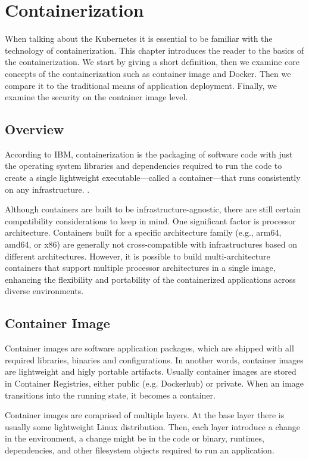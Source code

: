 \section{Containerization}

When talking about the Kubernetes it is essential to be familiar with the technology of containerization. This chapter introduces the reader to the basics of the containerization. We start by giving a short definition, then we examine core concepts of the containerization such as container image and Docker. Then we compare it to the traditional means of application deployment. Finally, we examine the security on the container image level.

\subsection{Overview}

According to IBM, containerization is the packaging of software code with just the operating system libraries and dependencies required to run the code to create a single lightweight executable—called a container—that runs consistently on any infrastructure. \cite{ibm-containerization}.

Although containers are built to be infrastructure-agnostic, there are still certain compatibility considerations to keep in mind. One significant factor is processor architecture. Containers built for a specific architecture family (e.g., arm64, amd64, or x86) are generally not cross-compatible with infrastructures based on different architectures. However, it is possible to build multi-architecture containers that support multiple processor architectures in a single image, enhancing the flexibility and portability of the containerized applications across diverse environments.

\subsection{Container Image}

Container images are software application packages, which are shipped with all required libraries, binaries and configurations. In another words, container images are lightweight and higly portable artifacts. Usually container images are stored in Container Registries, either public (e.g. Dockerhub) or private. When an image transitions into the running state, it becomes a container.

Container images are comprised of multiple layers. At the base layer there is usually some lightweight Linux distribution. Then, each layer introduce a change in the environment, a change might be in the code or binary, runtimes, dependencies, and other filesystem objects required to run an application.

